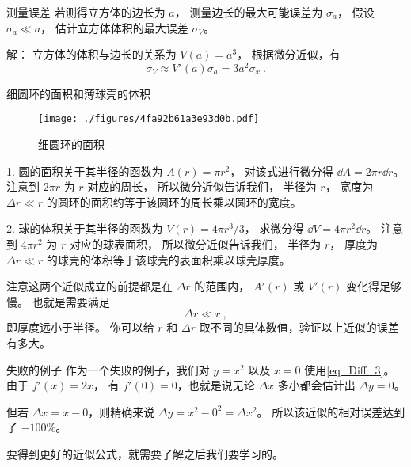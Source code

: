 \begin{example}{测量误差}\label{ex_Diff_1}
若测得立方体的边长为 $a$， 测量边长的最大可能误差为 $\sigma_a$， 假设 $\sigma_a \ll a$， 估计立方体体积的最大误差 $\sigma_V$。

解： 立方体的体积与边长的关系为 $V(a)=a^3$， 根据微分近似，有
\begin{equation}
\sigma_V \approx V'(a) \sigma_a = 3a^2 \sigma_x~.
\end{equation}
\end{example}

\begin{example}{细圆环的面积和薄球壳的体积}\label{ex_Diff_2}
\begin{figure}[ht]
\centering
\texttt{[image: ./figures/4fa92b61a3e93d0b.pdf]}
\caption{细圆环的面积} \label{fig_Diff_2}
\end{figure}

1. 圆的面积关于其半径的函数为 $A(r) = \pi r^2$， 对该式进行微分得 $\dd{A} = 2\pi r\dd{r}$。 注意到 $2\pi r$ 为 $r$ 对应的周长， 所以微分近似告诉我们， 半径为 $r$， 宽度为 $\Delta r \ll r$ 的圆环的面积约等于该圆环的周长乘以圆环的宽度。

2. 球的体积关于其半径的函数为 $V(r) = 4\pi r^3/3$， 求微分得 $\dd{V} = 4\pi r^2 \dd{r}$。 注意到 $4\pi r^2$ 为 $r$ 对应的球表面积， 所以微分近似告诉我们， 半径为 $r$， 厚度为 $\Delta r \ll r$ 的球壳的体积等于该球壳的表面积乘以球壳厚度。

注意这两个近似成立的前提都是在 $\Delta r$ 的范围内， $A'(r)$ 或 $V'(r)$ 变化得足够慢。 也就是需要满足
\begin{equation}
\Delta r \ll r~,
\end{equation}
即厚度远小于半径。 你可以给 $r$ 和 $\Delta r$ 取不同的具体数值，验证以上近似的误差有多大。
\end{example}

\begin{example}{失败的例子}
作为一个失败的例子，我们对 $y = x^2$ 以及 $x=0$ 使用\autoref{eq_Diff_3}。 由于 $f'(x) = 2x$， 有 $f'(0) = 0$，也就是说无论 $\Delta x$ 多小都会估计出 $\Delta y = 0$。

但若 $\Delta x = x - 0$，则精确来说 $\Delta y = x^2 - 0^2 = \Delta x^2$。 所以该近似的相对误差达到了 $-100\%$。
\end{example}

要得到更好的近似公式，就需要了解之后我们要学习的。
